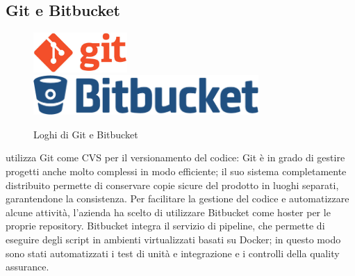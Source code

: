    \subsection{Git e Bitbucket}
   \begin{figure}[H]
      \centering
      {\includegraphics[height=1.5cm,keepaspectratio]{immagini/git-logo} }
      \qquad
      {\includegraphics[height=1.5cm,keepaspectratio]{immagini/bitbucket-logo} }
      \caption{Loghi di Git e Bitbucket}\label{loghigitbitbucket}
   \end{figure}
   \nomeAzienda{} utilizza Git come CVS per il versionamento del codice: Git è in grado di gestire progetti anche molto complessi in modo efficiente; il suo sistema completamente distribuito permette di conservare copie sicure del prodotto in luoghi separati, garantendone la consistenza. Per facilitare la gestione del codice e automatizzare alcune attività, l'azienda ha scelto di utilizzare Bitbucket come hoster per le proprie repository. Bitbucket integra il servizio di pipeline, che permette di eseguire degli script in ambienti virtualizzati basati su Docker; in questo modo sono stati automatizzati i test di unità e integrazione e i controlli della quality assurance.

